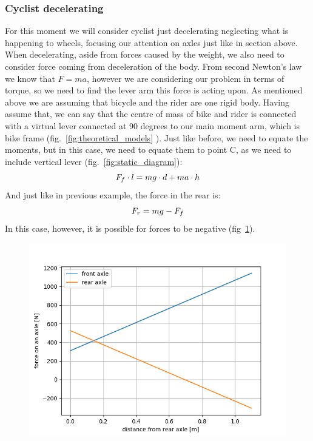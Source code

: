 \documentclass[12pt]{article}
\begin{document}
\subsubsection{Cyclist decelerating}
For this moment we will consider cyclist just decelerating neglecting what is happening to wheels, focusing
our attention on axles just like in section above. When decelerating, aside from forces caused by the weight, 
we also need to consider force coming from deceleration of the body. From second Newton's law we know that 
$F = ma$, however we are considering our problem in terms of torque, so we need to find the lever arm this
force is acting upon. As mentioned above we are assuming that bicycle and the rider are one rigid body. 
Having assume that, we can say that the centre of mass of bike and rider is connected with a virtual lever
connected at 90 degrees to our main moment arm, which is bike frame (fig.~\ref{fig:theoretical_models}
). Just like before, we need to equate the moments, but in this case, we need to 
equate them to point C, as we need to include vertical lever (fig.~\ref{fig:static_diagram}): 
\begin{equation}
\centering%
\label{eq:eq_torques_dyn}
F_f \cdot l = mg \cdot d + ma \cdot h
\end{equation}
And just like in previous example, the force in the rear is: 
\begin{equation}
\centering%
\label{eq:eq_torques_dyn}
F_r = mg - F_f
\end{equation}
In this case, however, it is possible for forces to be negative (fig~\ref{fig:dynamic_graph}).
\begin{figure}[H]
\centering
\caption{}
\includegraphics[width=0.8\linewidth]{axles_dynamic_graph}%
\label{fig:dynamic_graph}
\end{figure}
\end{document}

